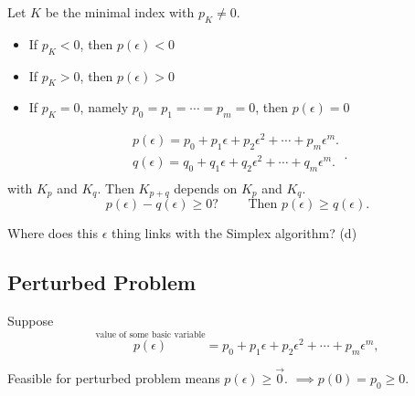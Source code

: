 \begin{definition}
	Let \(K\) be the minimal index with \(p_K \neq 0\).
	\begin{itemize}
		\item If \(p_K < 0\), then \(p(\epsilon) < 0\)
		\item If \(p_K > 0\), then \(p(\epsilon) > 0\)
		\item If \(p_K = 0\), namely \(p_0 = p_1 = \cdots = p_m = 0\), then \(p(\epsilon) = 0\)
	\end{itemize}
\end{definition}

\begin{note}
	\[
		\begin{split}
			p(\epsilon) = p_0 + p_1\epsilon + p_2 \epsilon^2 + \cdots + p_{m}\epsilon^m.	\\
			q(\epsilon) = q_0 + q_1\epsilon + q_2 \epsilon^2 + \cdots + q_{m}\epsilon^m.	\\
		\end{split}.
	\]
	with \(K_p\) and \(K_q\). Then \(K_{p+q}\) depends on \(K_p\) and \(K_q\).
	\[
		p(\epsilon) - q(\epsilon) \geq 0?\qquad \text{ Then }p(\epsilon) \geq  q(\epsilon).
	\]
\end{note}

\begin{problem}
Where does this \(\epsilon \) thing links with the Simplex algorithm? (d)
\end{problem}

\subsection{Perturbed Problem}
Suppose
\[
	\overset{\text{value of some basic variable}}{p(\epsilon)} = p_0 + p_1 \epsilon + p_2 \epsilon^2 + \cdots + p_m \epsilon^m,
\]

Feasible for perturbed problem means \(p(\epsilon) \geq \vec{0}\). \(\implies p(0) = p_0 \geq 0\).

